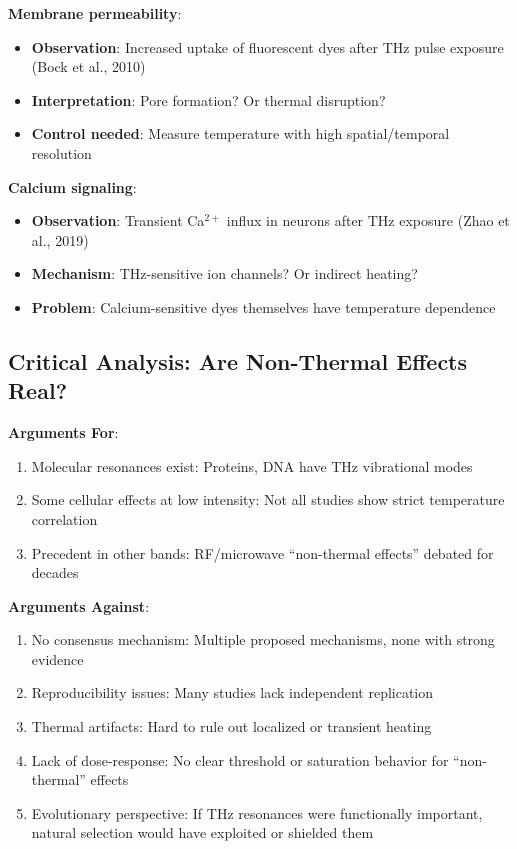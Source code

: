 \textbf{Membrane permeability}:
\begin{itemize}
\item \textbf{Observation}: Increased uptake of fluorescent dyes after THz pulse exposure (Bock et al., 2010)
\item \textbf{Interpretation}: Pore formation? Or thermal disruption?
\item \textbf{Control needed}: Measure temperature with high spatial/temporal resolution
\end{itemize}

\textbf{Calcium signaling}:
\begin{itemize}
\item \textbf{Observation}: Transient Ca$^{2+}$ influx in neurons after THz exposure (Zhao et al., 2019)
\item \textbf{Mechanism}: THz-sensitive ion channels? Or indirect heating?
\item \textbf{Problem}: Calcium-sensitive dyes themselves have temperature dependence
\end{itemize}

\subsection{Critical Analysis: Are Non-Thermal Effects Real?}

\textbf{Arguments For}:
\begin{enumerate}
\item Molecular resonances exist: Proteins, DNA have THz vibrational modes
\item Some cellular effects at low intensity: Not all studies show strict temperature correlation
\item Precedent in other bands: RF/microwave ``non-thermal effects'' debated for decades
\end{enumerate}

\textbf{Arguments Against}:
\begin{enumerate}
\item No consensus mechanism: Multiple proposed mechanisms, none with strong evidence
\item Reproducibility issues: Many studies lack independent replication
\item Thermal artifacts: Hard to rule out localized or transient heating
\item Lack of dose-response: No clear threshold or saturation behavior for ``non-thermal'' effects
\item Evolutionary perspective: If THz resonances were functionally important, natural selection would have exploited or shielded them
\end{enumerate}

